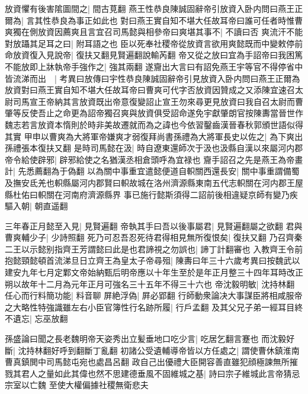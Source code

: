 放資懼有後害隂圖間之|{
	間古莧翻}
燕王性恭良陳誠固辭帝引放資入卧内問曰燕王正爾為|{
	言其性恭良為事正如此也}
對曰燕王實自知不堪大任故耳帝曰誰可任者時惟曹爽獨在側放資因薦爽且言宜召司馬懿與相參帝曰爽堪其事不|{
	不讀曰否}
爽流汗不能對放躡其足耳之曰|{
	附耳語之也}
臣以死奉社稷帝從放資言欲用爽懿既而中變敕停前命放資復入見說帝|{
	復扶又翻見賢遍翻說輸芮翻}
帝又從之放曰宜為手詔帝曰我困篤不能放即上牀執帝手強作之|{
	強其兩翻}
遂齎出大言曰有詔免燕王宇等官不得停省中皆流涕而出　|{
	考異曰放傳曰宇性恭良陳誠固辭帝引見放資入卧内問曰燕王正爾為放資對曰燕王實自知不堪大任故耳帝曰曹爽可代字否放資因贊成之又添陳宜速召太尉司馬宣王帝納其言放資既出帝意復變詔止宣王勿來尋更見放資曰我自召太尉而曹肇等反使吾止之命更為詔帝獨召爽與放資俱受詔命遂免宇獻肇朗官按陳夀當晉世作魏志若言放資本惰則於時非美故遷就而為之諱也今依習鑿齒漢晉春秋郭頒世語似得其實}
甲申以曹爽為大將軍帝嫌爽才弱復拜尚書孫禮為大將軍長史以佐之|{
	為下爽出孫禮張本復扶又翻}
是時司馬懿在汲|{
	時自遼東還師次于汲也汲縣自漢以來屬河内郡}
帝令給使辟邪|{
	辟邪給使之名猶漢丞相倉頭呼為宜禄也}
齎手詔召之先是燕王為帝畫計|{
	先悉薦翻為于偽翻}
以為關中事重宜遣懿便道自軹關西還長安|{
	關中事重謂備蜀及撫安氐羌也軹縣屬河内郡賢曰軹故城在洛州濟源縣東南五代志軹關在河内郡王屋縣杜佑曰軹關在河南府濟源縣界}
事已施行懿斯須得二詔前後相違疑京師有變乃疾驅入朝|{
	朝直遥翻}


三年春正月懿至入見|{
	見賢遍翻}
帝執其手曰吾以後事屬君|{
	見賢遍翻屬之欲翻}
君與曹爽輔少子|{
	少詩照翻}
死乃可忍吾忍死待君得相見無所復恨矣|{
	復扶又翻}
乃召齊秦二王以示懿别指齊王芳謂懿曰此是也君諦視之勿誤也|{
	諦丁計翻審也}
入教齊王令前抱懿頸懿頓首流涕旦日立齊王為皇太子帝尋殂|{
	陳夀曰年三十六歲考異曰按魏武以建安九年七月定鄴文帝始納甄后明帝應以十年生至於是年正月整三十四年耳時改正朔以故年十二月為元年正月可強名三十五年不得三十六也}
帝沈毅明敏|{
	沈持林翻}
任心而行料簡功能|{
	料音聊}
屏絶浮偽|{
	屛必郢翻}
行師動衆論决大事謀臣將相咸服帝之大略性特強識雖左右小臣官簿性行名跡所履|{
	行戶孟翻}
及其父兄子弟一經耳目終不遺忘|{
	忘巫放翻}


孫盛論曰聞之長老魏明帝天姿秀出立髪垂地口吃少言|{
	吃居乞翻言蹇也}
而沈毅好斷|{
	沈持林翻好呼到翻斷丁亂翻}
初諸公受遺輔導帝皆以方任處之|{
	謂使曹休鎮淮南曹真鎮閧中司馬懿屯宛也處昌呂翻}
政自己出優禮大臣開容善直雖犯顔極諫無所摧戮其君人之量如此其偉也然不思建德垂風不固維城之基|{
	詩曰宗子維城此言帝猜忌宗室以亡魏}
至使大權偏據社稷無衛悲夫

